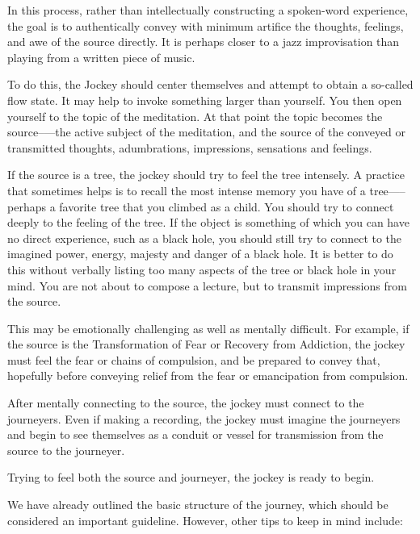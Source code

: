 \documentclass[12pt]{book}
\begin{document}
In this process, rather than intellectually constructing a spoken-word experience, the goal is to authentically convey with minimum artifice the thoughts, feelings, and awe of the source directly. It is perhaps closer to a jazz improvisation than playing from a written piece of music.
					
To do this, the Jockey should center themselves and attempt to obtain a so-called flow state. It may help to invoke something larger than yourself. You then open yourself to the topic of the meditation. At that point the topic becomes the source--—the active subject of the meditation, and the source of the conveyed or transmitted thoughts, adumbrations, impressions, sensations and feelings.
					
If the source is a tree, the jockey should try to feel the tree intensely. A practice that sometimes helps is to recall the most intense memory you have of a tree—--perhaps a favorite tree that you climbed as a child. You should try to connect deeply  to the feeling of the tree. If the object is something of which you can have no direct experience, such as a black hole, you should still try to connect to the imagined power, energy, majesty and danger of a black hole. It is better to do this without verbally listing too many aspects of the tree or black hole in your mind. You are not about to compose a lecture, but to transmit impressions from the source.
					
This may be emotionally challenging as well as mentally difficult. For example, if the source is the Transformation of Fear or Recovery from Addiction, the jockey must feel the fear or chains of compulsion, and be prepared to convey that, hopefully before conveying relief from the fear or emancipation from compulsion.
					
After mentally connecting to the source, the jockey must connect to the journeyers. Even if making a recording, the jockey must imagine the journeyers and begin to see themselves as a conduit or vessel for transmission from the source to the journeyer.
					
Trying to feel both the source and journeyer, the jockey is ready to begin.
					
We have already outlined the basic structure of the journey, which should be considered an important guideline. However, other tips to keep in mind include:
					
\end{document}
